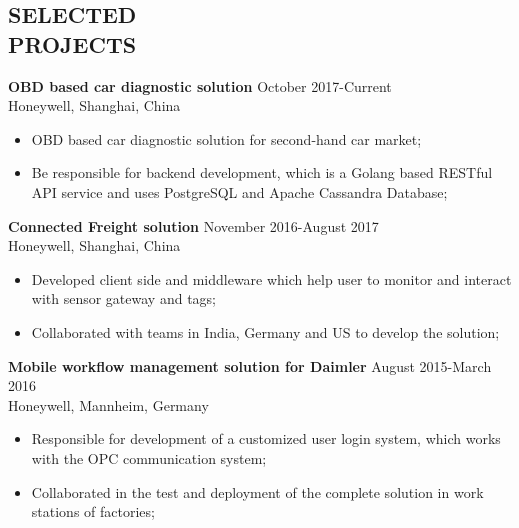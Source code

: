 \documentclass[margin, 10pt]{res} %
\begin{document}
\begin{resume}
\begin{CJK}{UTF8}{gbsn}

\section{SELECTED \\ PROJECTS}

\textbf{OBD based car diagnostic solution} \hfill October 2017-Current\\
Honeywell, Shanghai, China
\begin{itemize} \itemsep -2pt %
	\item OBD based car diagnostic solution for second-hand car market;
	\item Be responsible for backend development, which is a Golang based RESTful API service and uses PostgreSQL and Apache Cassandra Database;
\end{itemize}

\textbf{Connected Freight solution} \hfill November 2016-August 2017\\
Honeywell, Shanghai, China
\begin{itemize} \itemsep -2pt %
\item Developed client side and middleware which help user to monitor and interact with sensor gateway and tags;
\item Collaborated with teams in India, Germany and US to develop the solution;
\end{itemize}

\textbf{Mobile workflow management solution for Daimler} \hfill August 2015-March 2016\\
Honeywell, Mannheim, Germany
\begin{itemize} \itemsep -2pt %
\item Responsible for development of a customized user login system, which works with the OPC communication system;
\item Collaborated in the test and deployment of the complete solution in work stations of factories;
\end{itemize}


\end{CJK}
\end{resume}
\end{document}
